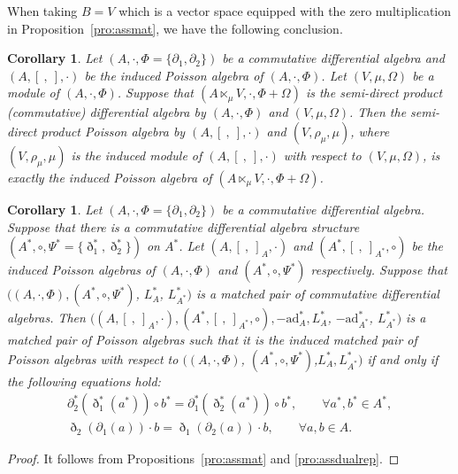 \documentclass[pdftex]{sigma}
\numberwithin{equation}{section}
\newtheorem{Corollary}[Theorem]{Corollary}
\newcommand{\ad}{\mathrm{ad}}
\begin{document}
When taking $B = V$ which is a vector space equipped with the zero multiplication in Proposition~\ref{pro:assmat}, we have the following conclusion.
\begin{Corollary}\label{cor:asssemi}
 Let $(A, \cdot, \Phi = \{\partial_1, \partial_2\})$ be a commutative differential algebra and $(A, [\ ,\ ], \cdot)$ be the induced Poisson algebra of $(A, \cdot, \Phi)$.
 	Let $(V, \mu, \Omega)$ be a module of $(A, \cdot, \Phi)$.
 	Suppose that $(A \ltimes_\mu V, \cdot, \Phi + \Omega)$ is the semi-direct product (commutative) differential algebra by $(A, \cdot, \Phi)$ and $(V, \mu, \Omega)$.
 Then the semi-direct product Poisson algebra by $(A, [\ ,\ ], \cdot)$ and $(V, \rho_\mu, \mu)$,
 where $(V, \rho_\mu, \mu)$ is the induced module of $(A, [\ ,\ ], \cdot)$ with respect to $(V, \mu, \Omega)$,
 is exactly the induced Poisson algebra of $(A \ltimes_\mu V, \cdot, \Phi + \Omega)$.
\end{Corollary}

\begin{Corollary}\label{cor:adjassmat}
 Let $(A, \cdot, \Phi = \{\partial_1, \partial_2\})$ be a commutative differential algebra.
 Suppose that there is a commutative differential algebra structure $(A^*, \circ, \Psi^*= \{\eth_1^*,\eth_2^*\})$ on $A^*$.
 Let $(A, [\ ,\ ]_A, \cdot)$ and $(A^*, [\ ,\ ]_{A^*}, \circ)$ be the induced Poisson algebras of $(A, \cdot, \Phi)$ and $(A^*, \circ, \Psi^*)$ respectively.
 Suppose that $((A, \cdot, \Phi), (A^*, \circ, \Psi^*)$, $L_{A}^*$, $L_{A^*}^*)$ is a matched pair of commutative differential algebras.
 Then $((A, [\ ,\ ]_A, \cdot), (A^*, [\ ,\ ]_{A^*}, \circ), -\ad_A^*, L_A^*$, $-\ad_{A^*}^*$, $L_{A^*}^*)$ is a matched pair of Poisson algebras
 such that it is the induced matched pair of Poisson algebras with respect to
 $((A, \cdot, \Phi)$, $(A^*, \circ, \Psi^*)$,$L_{A}^*,L_{A^*}^*)$
 if and only if the following equations hold:
 \begin{gather}
 \partial_2^*(\eth_1^*(a^*)) \circ b^* = \partial_1^*(\eth_2^*(a^*)) \circ b^* , \qquad
 \forall a^*, b^* \in A^*, \label{eq:bvip2}\\
\eth_2(\partial_1(a)) \cdot b = \eth_1(\partial_2(a)) \cdot b , \qquad
 \forall a, b \in A. \label{eq:vip1}
 \end{gather}
\end{Corollary}
\begin{proof}
 It follows from Propositions~\ref{pro:assmat} and \ref{pro:assdualrep}.
\end{proof}
\end{document}
